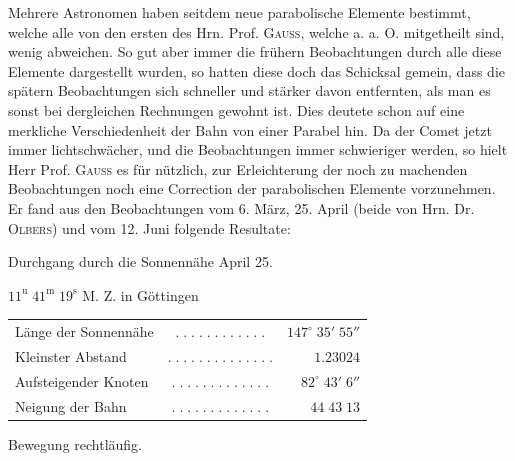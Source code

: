 \par\indent Mehrere Astronomen haben seitdem neue parabolische Elemente bestimmt, welche alle von den
ersten des Hrn. Prof. \textsc{Gauss}, welche a. a. O. mitgetheilt sind, wenig abweichen. So gut aber immer
die frühern Beobachtungen durch alle diese Elemente dargestellt wurden, so hatten diese doch das
Schicksal gemein, dass die spätern Beobachtungen sich schneller und stärker davon entfernten, als
man es sonst bei dergleichen Rechnungen gewohnt ist. Dies deutete schon auf eine merkliche
Verschiedenheit der Bahn von einer Parabel hin. Da der Comet jetzt immer lichtschwächer, und die
Beobachtungen immer schwieriger werden, so hielt Herr Prof. \textsc{Gauss} es für nützlich, zur
Erleichterung der noch zu machenden Beobachtungen noch eine Correction der parabolischen Elemente
vorzunehmen. Er fand aus den Beobachtungen vom 6. März, 25. April (beide von Hrn. Dr. \textsc{Olbers}) und
vom 12. Juni folgende Resultate:

\begin{center}\fontsize{10}{12}\selectfont Durchgang durch die Sonnennähe April 25.\par $11^{\mathrm u}\;41^{\mathrm m}\;19^{\mathrm s}$ M. Z. in Göttingen\end{center}
\begin{center}\fontsize{10}{12}\selectfont\setlength{\tabcolsep}{3pt}\renewcommand{\arraystretch}{1.15}\begin{tabular}{lcr}
Länge der Sonnennähe & $.\;.\;.\;.\;.\;.\;.\;.\;.\;.\;.\;.$ & $147^\circ\;35'\;55''$\\
Kleinster Abstand & $.\;.\;.\;.\;.\;.\;.\;.\;.\;.\;.\;.\;.\;.$ & $1.23024$\\
Aufsteigender Knoten & $.\;.\;.\;.\;.\;.\;.\;.\;.\;.\;.\;.\;.$ & $82^\circ\;43'\;6''$\\
Neigung der Bahn & $.\;.\;.\;.\;.\;.\;.\;.\;.\;.\;.\;.\;.$ & $44\;43\;13$\\
\end{tabular}\end{center}\begin{center}Bewegung rechtläufig.\end{center}

